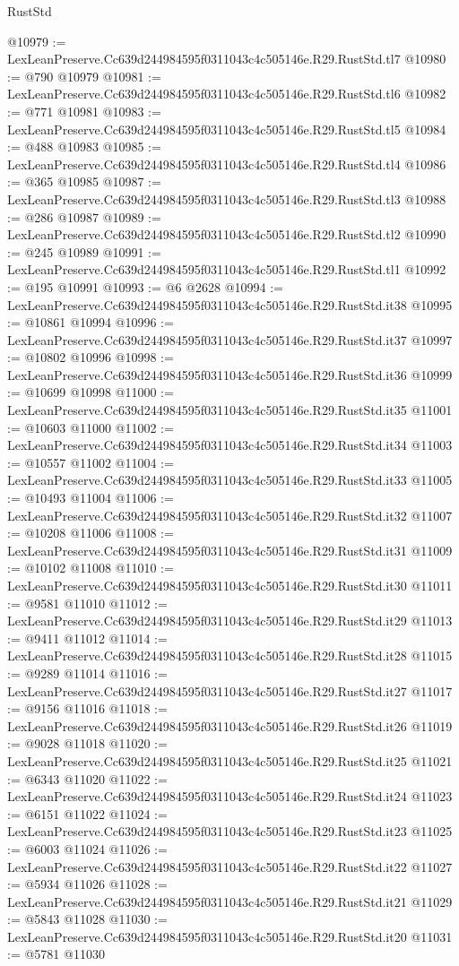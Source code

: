 \begin{lexlean}{RustStd}
\begin{coremodule}
@10979 := LexLeanPreserve.Cc639d244984595f0311043c4c505146e.R29.RustStd.tl7
@10980 := @790 @10979
@10981 := LexLeanPreserve.Cc639d244984595f0311043c4c505146e.R29.RustStd.tl6
@10982 := @771 @10981
@10983 := LexLeanPreserve.Cc639d244984595f0311043c4c505146e.R29.RustStd.tl5
@10984 := @488 @10983
@10985 := LexLeanPreserve.Cc639d244984595f0311043c4c505146e.R29.RustStd.tl4
@10986 := @365 @10985
@10987 := LexLeanPreserve.Cc639d244984595f0311043c4c505146e.R29.RustStd.tl3
@10988 := @286 @10987
@10989 := LexLeanPreserve.Cc639d244984595f0311043c4c505146e.R29.RustStd.tl2
@10990 := @245 @10989
@10991 := LexLeanPreserve.Cc639d244984595f0311043c4c505146e.R29.RustStd.tl1
@10992 := @195 @10991
@10993 := @6 @2628
@10994 := LexLeanPreserve.Cc639d244984595f0311043c4c505146e.R29.RustStd.it38
@10995 := @10861 @10994
@10996 := LexLeanPreserve.Cc639d244984595f0311043c4c505146e.R29.RustStd.it37
@10997 := @10802 @10996
@10998 := LexLeanPreserve.Cc639d244984595f0311043c4c505146e.R29.RustStd.it36
@10999 := @10699 @10998
@11000 := LexLeanPreserve.Cc639d244984595f0311043c4c505146e.R29.RustStd.it35
@11001 := @10603 @11000
@11002 := LexLeanPreserve.Cc639d244984595f0311043c4c505146e.R29.RustStd.it34
@11003 := @10557 @11002
@11004 := LexLeanPreserve.Cc639d244984595f0311043c4c505146e.R29.RustStd.it33
@11005 := @10493 @11004
@11006 := LexLeanPreserve.Cc639d244984595f0311043c4c505146e.R29.RustStd.it32
@11007 := @10208 @11006
@11008 := LexLeanPreserve.Cc639d244984595f0311043c4c505146e.R29.RustStd.it31
@11009 := @10102 @11008
@11010 := LexLeanPreserve.Cc639d244984595f0311043c4c505146e.R29.RustStd.it30
@11011 := @9581 @11010
@11012 := LexLeanPreserve.Cc639d244984595f0311043c4c505146e.R29.RustStd.it29
@11013 := @9411 @11012
@11014 := LexLeanPreserve.Cc639d244984595f0311043c4c505146e.R29.RustStd.it28
@11015 := @9289 @11014
@11016 := LexLeanPreserve.Cc639d244984595f0311043c4c505146e.R29.RustStd.it27
@11017 := @9156 @11016
@11018 := LexLeanPreserve.Cc639d244984595f0311043c4c505146e.R29.RustStd.it26
@11019 := @9028 @11018
@11020 := LexLeanPreserve.Cc639d244984595f0311043c4c505146e.R29.RustStd.it25
@11021 := @6343 @11020
@11022 := LexLeanPreserve.Cc639d244984595f0311043c4c505146e.R29.RustStd.it24
@11023 := @6151 @11022
@11024 := LexLeanPreserve.Cc639d244984595f0311043c4c505146e.R29.RustStd.it23
@11025 := @6003 @11024
@11026 := LexLeanPreserve.Cc639d244984595f0311043c4c505146e.R29.RustStd.it22
@11027 := @5934 @11026
@11028 := LexLeanPreserve.Cc639d244984595f0311043c4c505146e.R29.RustStd.it21
@11029 := @5843 @11028
@11030 := LexLeanPreserve.Cc639d244984595f0311043c4c505146e.R29.RustStd.it20
@11031 := @5781 @11030

\end{coremodule}
\end{lexlean}
